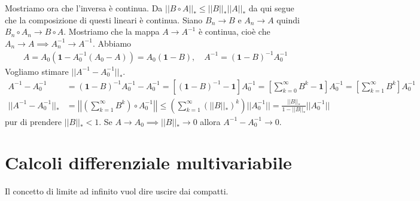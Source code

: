 \documentclass[a4paper]{article}
\begin{document}
{    Mostriamo ora che l'inversa è continua.
    Da \(||B\circ A||_* \leq ||B||_* ||A||_*\)
    da qui segue che la composizione di questi lineari è continua.
    Siano \(B_n \to B\) e \(A_n \to A\) quindi \(B_n \circ A_n \to B\circ A\).
    Mostriamo che la mappa \(A \to A^{-1}\) è continua, cioè che
    \(A_n \to A \implies A_n^{-1} \to A^{-1}\). Abbiamo
    \begin{align*}
        A = A_0(\mathbf{1} - A_0^{-1}(A_0 - A)) = A_0(\mathbf{1} - B), \quad A^{-1} = (\mathbf{1} - B)^{-1} A_0^{-1}
    \end{align*}
    Vogliamo stimare \(||A^{-1} - A_0^{-1}||_*\).
    \begin{align*}
        A^{-1} - A_0^{-1} &=
        {(\mathbf{1} - B)}^{-1} A_0^{-1} - A_0^{-1}
        = \left[
            {(\mathbf{1} - B)}^{-1} - \mathbf{1}
        \right]A_0^{-1} = \left[
            \sum_{k=0}^\infty B^k - \mathbf{1}
        \right]A_0^{-1} = \left[\sum_{k=1}^\infty B^k\right] A_0^{-1} \\
        ||A^{-1} - A_0^{-1}||_*
        &= \left|\left| \left(\sum_{k=1}^\infty B^k\right) \circ A_0^{-1}
        \right|\right|
        \leq \left(\sum_{k=1}^\infty {(||B||_*)}^k\right) ||A_0^{-1}||
        = \frac{||B||_*}{1 - ||B||_*} ||A_0^{-1} ||
    \end{align*}
    pur di prendere \(||B||_* < 1\).
    Se \(A \to A_0 \implies ||B||_* \to 0\) allora \( A^{-1} - A_0^{-1} \to 0\).
}

\pagebreak

\section{Calcoli differenziale multivariabile}


Il concetto di limite ad infinito vuol dire uscire dai compatti.

\end{document}
